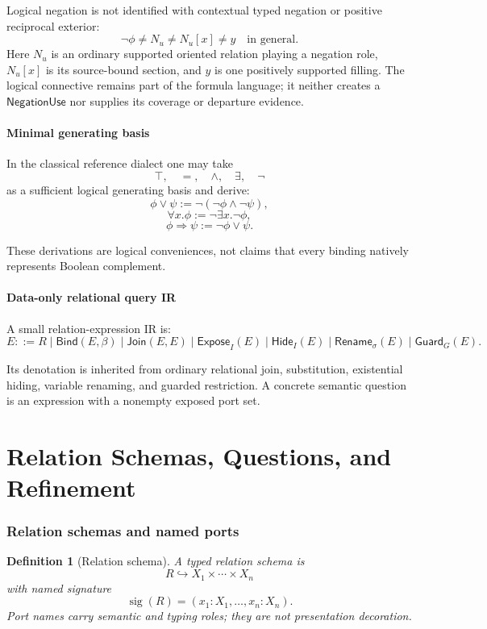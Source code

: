 \documentclass[11pt,oneside]{article}
\newtheorem{definition}{Definition}[section]
\begin{document}
Logical negation is not identified with contextual typed negation or positive reciprocal exterior:
\[
\boxed{
\neg\phi
\neq N_u
\neq N_u[x]
\neq y
\quad\text{in general}.
}
\]
Here \(N_u\) is an ordinary supported oriented relation playing a negation role, \(N_u[x]\) is its source-bound section, and \(y\) is one positively supported filling.  The logical connective remains part of the formula language; it neither creates a \(\mathsf{NegationUse}\) nor supplies its coverage or departure evidence.

\subsection{Minimal generating basis}

In the classical reference dialect one may take
\[
\top,\quad =,\quad \land,\quad \exists,\quad \neg
\]
as a sufficient logical generating basis and derive:
\[
\phi\lor\psi
:=
\neg(\neg\phi\land\neg\psi),
\]
\[
\forall x.\phi
:=
\neg\exists x.\neg\phi,
\]
\[
\phi\Rightarrow\psi
:=
\neg\phi\lor\psi.
\]

These derivations are logical conveniences, not claims that every binding natively represents Boolean complement.

\subsection{Data-only relational query IR}

A small relation-expression IR is:
\[
\boxed{
E ::=
R
\mid \mathsf{Bind}(E,\beta)
\mid \mathsf{Join}(E,E)
\mid \mathsf{Expose}_I(E)
\mid \mathsf{Hide}_I(E)
\mid \mathsf{Rename}_{\sigma}(E)
\mid \mathsf{Guard}_G(E).
}
\]

Its denotation is inherited from ordinary relational join, substitution, existential hiding, variable renaming, and guarded restriction.  A concrete semantic question is an expression with a nonempty exposed port set.

\part{Relation Schemas, Questions, and Refinement}

\section{Relation schemas and named ports}

\begin{definition}[Relation schema]
A typed relation schema is
\[
R\hookrightarrow X_1\times\cdots\times X_n
\]
with named signature
\[
\operatorname{sig}(R)
=
(x_1:X_1,\ldots,x_n:X_n).
\]
Port names carry semantic and typing roles; they are not presentation decoration.
\end{definition}
\end{document}

